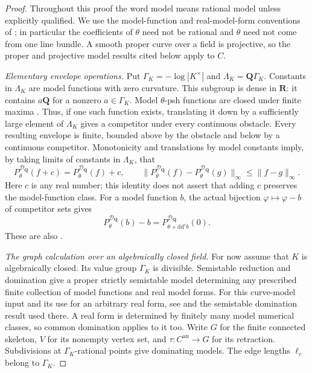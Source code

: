 \begin{proof}
Throughout this proof the word model means rational model unless explicitly
qualified.  We use the model-function and real-model-form conventions of
\cite[\S\S2.2--2.8]{GJKM19}; in particular the coefficients of $\theta$
need not be rational and $\theta$ need not come from one line bundle.
A smooth proper curve over a field is projective, so the proper and
projective model results cited below apply to $C$.

\emph{Elementary envelope operations.}
Put $\Gamma_K=-\log|K^\times|$ and
$\Lambda_K=\mathbf Q\Gamma_K$.  Constants in $\Lambda_K$ are model
functions with zero curvature.  This subgroup is dense in $\mathbf R$:
it contains $a\mathbf Q$ for a nonzero $a\in\Gamma_K$.
Model $\theta$-psh functions are closed under finite maxima
\cite[\S2.5]{GJKM19}.  Thus, if one such function exists, translating it
down by a sufficiently large element of $\Lambda_K$ gives a competitor
under every continuous obstacle.  Every resulting envelope is finite,
bounded above by the obstacle and below by a continuous competitor.
Monotonicity and translations by model constants imply, by taking limits
of constants in $\Lambda_K$, that
\begin{equation}
\label{eq:curve-envelope-contraction}
 P^{\mathcal D_{\mathbf Q}}_\theta(f+c)
       =P^{\mathcal D_{\mathbf Q}}_\theta(f)+c,
 \qquad
 \|P^{\mathcal D_{\mathbf Q}}_\theta(f)
       -P^{\mathcal D_{\mathbf Q}}_\theta(g)\|_\infty
       \leq\|f-g\|_\infty.
\end{equation}
Here $c$ is any real number; this identity does not assert that adding
$c$ preserves the model-function class.  For a model function $b$, the
actual bijection $\varphi\mapsto\varphi-b$ of competitor sets gives
\begin{equation}
\label{eq:ch29-real-model-obstacle-translation}
 P^{\mathcal D_{\mathbf Q}}_\theta(b)-b
       =P^{\mathcal D_{\mathbf Q}}_{\theta+\mathrm d\mathrm d^cb}(0).
\end{equation}
These are also \cite[Proposition~2.9(3)--(5)]{GJKM19}.

\emph{The graph calculation over an algebraically closed field.}
For now assume that $K$ is algebraically closed.  Its value group
$\Gamma_K$ is divisible.  Semistable reduction and domination give a
proper strictly semistable model determining any prescribed finite
collection of model functions and real model forms.  For this curve-model
input and its use for an arbitrary real form, see
\cite[proof of Proposition~3.7]{GJKM19} and the semistable domination
result \cite[\S7]{BL85} used there.  A real form is determined by finitely
many model numerical classes, so common domination applies to it too.
Write $G$ for the finite connected skeleton, $V$ for its nonempty vertex
set, and $\tau:C^{\mathrm{an}}\to G$ for its retraction.  Subdivisions
at $\Gamma_K$-rational points give dominating models.  The edge lengths
$\ell_e$ belong to $\Gamma_K$.


\end{proof}
